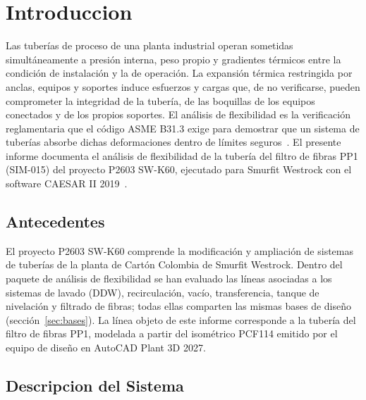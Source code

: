 \section{Introduccion}
\label{sec:intro}

Las tuber\'{i}as de proceso de una planta industrial operan sometidas
simult\'{a}neamente a presi\'{o}n interna, peso propio y gradientes t\'{e}rmicos
entre la condici\'{o}n de instalaci\'{o}n y la de operaci\'{o}n. La expansi\'{o}n
t\'{e}rmica restringida por anclas, equipos y soportes induce esfuerzos y cargas
que, de no verificarse, pueden comprometer la integridad de la tuber\'{i}a, de las
boquillas de los equipos conectados y de los propios soportes. El an\'{a}lisis de
flexibilidad es la verificaci\'{o}n reglamentaria que el c\'{o}digo ASME B31.3
exige para demostrar que un sistema de tuber\'{i}as absorbe dichas deformaciones
dentro de l\'{i}mites seguros~\cite{asme_b313_2016}. El presente informe documenta
el an\'{a}lisis de flexibilidad de la tuber\'{i}a del filtro de fibras
PP1 (SIM-015) del proyecto P2603 SW-K60,
ejecutado para Smurfit Westrock con el software CAESAR II
2019~\cite{caesar2_ug_2019}.

\subsection{Antecedentes}

El proyecto P2603 SW-K60 comprende la modificaci\'{o}n y ampliaci\'{o}n de
sistemas de tuber\'{i}as de la planta de Cart\'{o}n Colombia de Smurfit Westrock.
Dentro del paquete de an\'{a}lisis de flexibilidad se han evaluado las
l\'{i}neas asociadas a los sistemas de lavado (DDW), recirculaci\'{o}n, vac\'{i}o,
transferencia, tanque de nivelaci\'{o}n y filtrado de fibras; todas ellas
comparten las mismas bases de dise\~{n}o
(secci\'{o}n~\ref{sec:bases}). La l\'{i}nea objeto de este informe corresponde a
la tuber\'{i}a del filtro de fibras PP1, modelada a partir
del isom\'{e}trico PCF114 emitido por el equipo de dise\~{n}o en AutoCAD Plant
3D 2027.

\subsection{Descripcion del Sistema}

